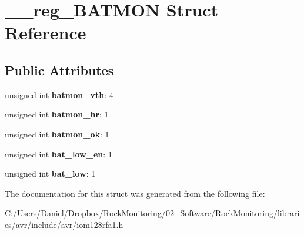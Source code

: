 \hypertarget{struct____reg___b_a_t_m_o_n}{}\section{\+\_\+\+\_\+reg\+\_\+\+B\+A\+T\+M\+ON Struct Reference}
\label{struct____reg___b_a_t_m_o_n}
\subsection*{Public Attributes}
\begin{DoxyCompactItemize}
\item 
unsigned int {\bfseries batmon\+\_\+vth}\+: 4\hypertarget{struct____reg___b_a_t_m_o_n_a0f110e72968fa39da211ee87f7842739}{}\label{struct____reg___b_a_t_m_o_n_a0f110e72968fa39da211ee87f7842739}

\item 
unsigned int {\bfseries batmon\+\_\+hr}\+: 1\hypertarget{struct____reg___b_a_t_m_o_n_a724bcac57b986fac328b72047550dafe}{}\label{struct____reg___b_a_t_m_o_n_a724bcac57b986fac328b72047550dafe}

\item 
unsigned int {\bfseries batmon\+\_\+ok}\+: 1\hypertarget{struct____reg___b_a_t_m_o_n_a7db9f0e43cb4ba360445965af1805aae}{}\label{struct____reg___b_a_t_m_o_n_a7db9f0e43cb4ba360445965af1805aae}

\item 
unsigned int {\bfseries bat\+\_\+low\+\_\+en}\+: 1\hypertarget{struct____reg___b_a_t_m_o_n_a36fd4cf3c47b1f7d95c5be867322cef4}{}\label{struct____reg___b_a_t_m_o_n_a36fd4cf3c47b1f7d95c5be867322cef4}

\item 
unsigned int {\bfseries bat\+\_\+low}\+: 1\hypertarget{struct____reg___b_a_t_m_o_n_a79797d3720c6fa583f3958667398906b}{}\label{struct____reg___b_a_t_m_o_n_a79797d3720c6fa583f3958667398906b}

\end{DoxyCompactItemize}


The documentation for this struct was generated from the following file\+:\begin{DoxyCompactItemize}
\item 
C\+:/\+Users/\+Daniel/\+Dropbox/\+Rock\+Monitoring/02\+\_\+\+Software/\+Rock\+Monitoring/libraries/avr/include/avr/iom128rfa1.\+h\end{DoxyCompactItemize}
